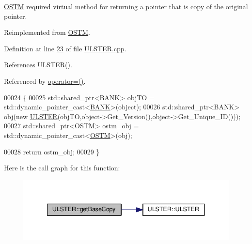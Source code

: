 \hyperlink{class_o_s_t_m}{O\+S\+TM} required virtual method for returning a pointer that is copy of the original pointer. 



Reimplemented from \hyperlink{class_o_s_t_m_a0bfa3763bd441407dd6365f42714f94c_a0bfa3763bd441407dd6365f42714f94c}{O\+S\+TM}.



Definition at line \hyperlink{_u_l_s_t_e_r_8cpp_source_l00023}{23} of file \hyperlink{_u_l_s_t_e_r_8cpp_source}{U\+L\+S\+T\+E\+R.\+cpp}.



References \hyperlink{_u_l_s_t_e_r_8h_source_l00024}{U\+L\+S\+T\+E\+R()}.



Referenced by \hyperlink{_u_l_s_t_e_r_8h_source_l00062}{operator=()}.


\begin{DoxyCode}
00024 \{
00025     std::shared\_ptr<BANK> objTO = std::dynamic\_pointer\_cast<\hyperlink{class_b_a_n_k}{BANK}>(object);
00026     std::shared\_ptr<BANK> obj(\textcolor{keyword}{new} \hyperlink{class_u_l_s_t_e_r_a637ad8cb5537167ab51cd079637a8323_a637ad8cb5537167ab51cd079637a8323}{ULSTER}(objTO,object->Get\_Version(),\textcolor{keywordtype}{object}->Get\_Unique\_ID())); 
00027     std::shared\_ptr<OSTM> ostm\_obj = std::dynamic\_pointer\_cast<\hyperlink{class_o_s_t_m}{OSTM}>(obj);                             
           
00028     \textcolor{keywordflow}{return} ostm\_obj;
00029 \}
\end{DoxyCode}


Here is the call graph for this function\+:
\nopagebreak
\begin{figure}[H]
\begin{center}
\leavevmode
\includegraphics[width=340pt]{class_u_l_s_t_e_r_ad0c05e562b0c67283edfa4940c9aa728_ad0c05e562b0c67283edfa4940c9aa728_cgraph}
\end{center}
\end{figure}



